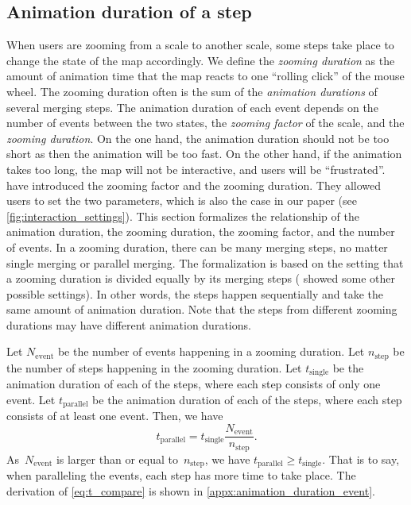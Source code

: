 \documentclass[]{interact}
\begin{document}


\subsection{Animation duration of a step}
\label{sec:zooming_duration}

When users are zooming from a scale to another scale,
some steps take place to change the state of the map accordingly.
We define the \emph{zooming duration} as the amount of 
animation time that the map reacts to one ``rolling click'' of the mouse wheel.
The zooming duration often is the sum of 
the \emph{animation durations} of several merging steps.
The animation duration of each event depends on 
the number of events between the two states,
the \emph{zooming factor} of the scale, and 
the \emph{zooming duration}.
On the one hand, the animation duration should not be too short 
as then the animation will be too fast. 
On the other hand, if the animation takes too long, 
the map will not be interactive, and users will be ``frustrated''.
\citet[][]{Meijers2020Web} 
have introduced the zooming factor and the zooming duration.
They allowed users to set the two parameters,
which is also the case in our paper
(see \fig\ref{fig:interaction_settings}).
This section formalizes the relationship of the animation duration,
the zooming duration, the zooming factor, and the number of events.
In a zooming duration, there can be many merging steps,
no matter single merging or parallel merging.
The formalization is based on the setting that
a zooming duration is divided equally by its merging steps
(\citet[][]{Suba2017Thesis} showed some other possible settings).
In other words,
the steps happen sequentially and take the same amount of animation duration.
Note that the steps from different zooming durations 
may have different animation durations.

Let $N_\mathrm{event}$ be the number of events happening in a zooming duration.
Let $n_\mathrm{step}$ be the number of steps happening in the zooming duration.
Let $t_\mathrm{single}$ be the animation duration of each of the steps,
where each step consists of only one event.
Let $t_\mathrm{parallel}$ be the animation duration of each of the steps,
where each step consists of at least one event.
Then, we have 
\begin{equation}
\label{eq:t_compare}
t_\mathrm{parallel} = t_\mathrm{single}  \frac{N_\mathrm{event}}{n_\mathrm{step}}.
\end{equation}
As~$N_\mathrm{event}$ is larger than or equal to~$n_\mathrm{step}$,
we have $t_\mathrm{parallel} \ge t_\mathrm{single}$.
That is to say, when paralleling the events,
each step has more time to take place. 
The derivation of \eq\ref{eq:t_compare} is shown 
in \appx\ref{appx:animation_duration_event}.
\end{document}
